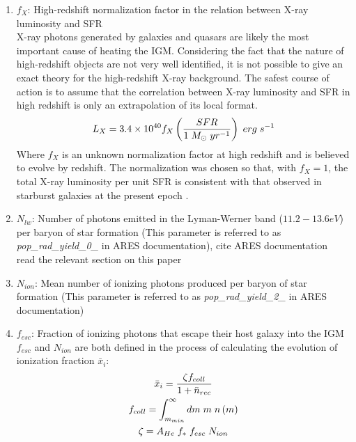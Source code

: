 \documentclass[12pt, TexShade, letterpaper]{report}
\begin{document}
\begin{enumerate}
    \item \textbf{$f_X$}: High-redshift normalization factor in the relation between X-ray luminosity and SFR\\
    X-ray photons generated by galaxies and quasars are likely the most important cause of heating the IGM. Considering the fact that the nature of high-redshift objects are not very well identified, it is not possible to give an exact theory for the high-redshift X-ray background. The safest course of action is to assume that the correlation between X-ray luminosity and SFR in high redshift is only an extrapolation of its local format.
    \begin{equation}
        L_X = 3.4 \times 10^{40} f_X \left( \frac{SFR}{1 \hspace{0.1cm} M_{\odot} \hspace{0.1cm} yr^{-1}}\right) \hspace{0.1cm} erg \hspace{0.1cm}s^{-1}
    \end{equation}
    Where $f_X$ is an unknown normalization factor at high redshift and is believed to evolve by redshift. The normalization was chosen so that, with $f_X =1$, the total X-ray luminosity per unit SFR is consistent with that observed in starburst galaxies at the present epoch \cite{low_frequency, 21century}.
    
    \item \textbf{$N_{lw}$}: Number of photons emitted in the Lyman-Werner band ($11.2-13.6eV$) per baryon of star formation (This parameter is referred to as \emph{pop\_rad\_yield\_0\_} in ARES documentation), cite ARES documentation\\ read the relevant section on this paper \cite{lw_background}
    
    \item \textbf{$N_{ion}$}: Mean number of ionizing photons produced per baryon of star formation (This parameter is referred to as \emph{pop\_rad\_yield\_2\_} in ARES documentation)
    
    \item \textbf{$f_{esc}$}: Fraction of ionizing photons that escape their host galaxy into the IGM\\
    $f_{esc}$ and $N_{ion}$ are both defined in the process of calculating the evolution of ionization fraction $\bar{x}_i$:
    \begin{gather}
        \bar{x}_i = \frac{\zeta f_{coll}}{1 + \bar{n}_{rec}}\\
        f_{coll} = \int_{m_{min}}^\infty dm \hspace{0.1cm} m \hspace{0.1cm} n\left(m\right)\\
        \zeta = A_{He} \hspace{0.1cm} f_* \hspace{0.1cm} f_{esc} \hspace{0.1cm} N_{ion}
    \end{gather}
    

\end{enumerate}
\end{document}
